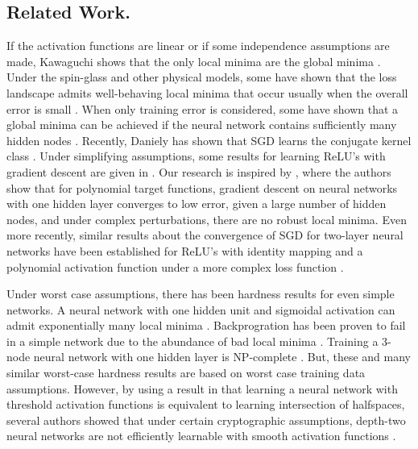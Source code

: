 
\subsection{Related Work.}
If the activation functions are linear or
if some independence assumptions are made, Kawaguchi shows that the
only local minima are the global minima \cite{Kawaguchi16a}. Under the
spin-glass and other physical models, some have shown that the loss
landscape admits well-behaving local minima that occur usually when the
overall error is small
\cite{ChoromanskaHMAL14, DauphinPGCGB14}. When only training
error is considered, some have shown that a global minima can be
achieved if the neural network contains sufficiently many hidden nodes
\cite{SoudryC16}. Recently, Daniely has shown that SGD learns the conjugate kernel class \cite{daniely2017sgd}. Under simplifying assumptions, some results for learning ReLU's with gradient descent are given in \cite{tian2017analytical, brutzkus2017globally}. Our research is inspired by
\cite{valiant2014learning}, where the authors show that for polynomial 
target functions, gradient descent on neural networks
with one hidden layer converges to low error, given a large
number of hidden nodes, and under complex perturbations,
there are no robust local minima. Even more recently, similar results about the convergence of SGD for two-layer neural networks have been established for ReLU's with identity mapping and a polynomial activation function under a more complex loss function \cite{li2017convergence,ge2017learning}.

Under worst case assumptions, there has been hardness results for even simple networks. A neural network with one hidden unit and sigmoidal activation can admit exponentially many local minima \cite{Auer}. Backprogration has been proven to fail in a simple network due to the abundance of bad local minima \cite{brady1989back}. Training a 3-node neural network with one hidden layer is { NP}-complete \cite{BlumR88}.  But, these and many similar worst-case hardness results are based on worst case training data assumptions. However, by using a result in \cite{klivans2006cryptographic} that learning a neural network with threshold activation functions is equivalent to learning intersection of halfspaces, several authors showed that under certain cryptographic assumptions, depth-two neural networks are not efficiently learnable with smooth activation functions \cite{LivniSS14, ZhangLWJ15, ZhangLJ15}.


